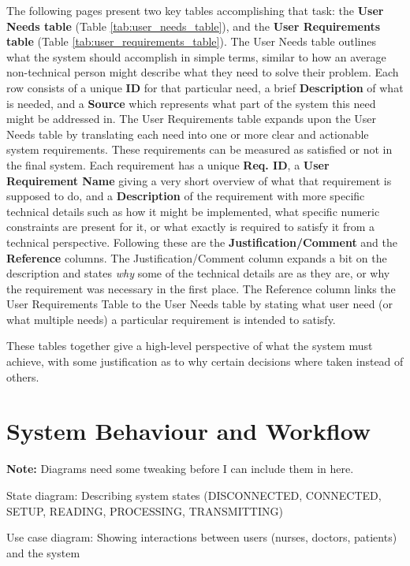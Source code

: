 The following pages present two key tables accomplishing that task: the \textbf{User Needs table} (Table \ref{tab:user_needs_table}), and the \textbf{User Requirements table} (Table \ref{tab:user_requirements_table}). The User Needs table outlines what the system should accomplish in simple terms, similar to how an average non-technical person might describe what they need to solve their problem. Each row consists of a unique \textbf{ID} for that particular need, a brief \textbf{Description} of what is needed, and a \textbf{Source} which represents what part of the system this need might be addressed in. The User Requirements table expands upon the User Needs table by translating each need into one or more clear and actionable system requirements. These requirements can be measured as satisfied or not in the final system. Each requirement has a unique \textbf{Req. ID}, a \textbf{User Requirement Name} giving a very short overview of what that requirement is supposed to do, and a \textbf{Description} of the requirement with more specific technical details such as how it might be implemented, what specific numeric constraints are present for it, or what exactly is required to satisfy it from a technical perspective. Following these are the \textbf{Justification/Comment} and the \textbf{Reference} columns. The Justification/Comment column expands a bit on the description and states \textit{why} some of the technical details are as they are, or why the requirement was necessary in the first place. The Reference column links the User Requirements Table to the User Needs table by stating what user need (or what multiple needs) a particular requirement is intended to satisfy.

These tables together give a high-level perspective of what the system must achieve, with some justification as to why certain decisions where taken instead of others.


\clearpage

\clearpage

\section{System Behaviour and Workflow} %
\textbf{Note:} Diagrams need some tweaking before I can include them in here.

State diagram: Describing system states (DISCONNECTED, CONNECTED, SETUP, READING, PROCESSING, TRANSMITTING)

Use case diagram: Showing interactions between users (nurses, doctors, patients) and the system


